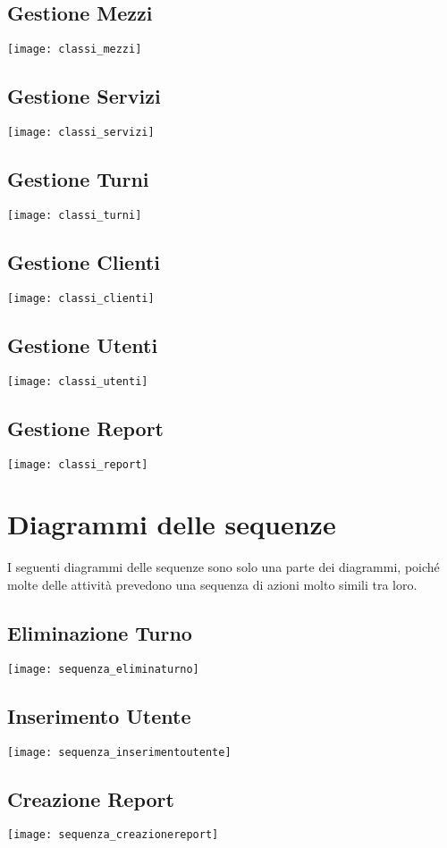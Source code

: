 \documentclass[green, fancy, 11pt]{elegantbook}
\begin{document}
\subsection{Gestione Mezzi}
\noindent \texttt{[image: classi\_mezzi]}
\newpage

\subsection{Gestione Servizi}
\noindent \texttt{[image: classi\_servizi]}
\subsection{Gestione Turni}
\noindent \texttt{[image: classi\_turni]}
\newpage

\subsection{Gestione Clienti}
\noindent \texttt{[image: classi\_clienti]}
\subsection{Gestione Utenti}
\noindent \texttt{[image: classi\_utenti]}
\newpage

\subsection{Gestione Report}
\noindent \texttt{[image: classi\_report]}
\newpage

\section{Diagrammi delle sequenze}
\noindent I seguenti diagrammi delle sequenze sono solo una parte dei diagrammi, poiché molte delle attività prevedono una sequenza di azioni molto simili tra loro.
\subsection{Eliminazione Turno}
\noindent \texttt{[image: sequenza\_eliminaturno]}
\newpage
\subsection{Inserimento Utente}
\noindent \texttt{[image: sequenza\_inserimentoutente]}
\subsection{Creazione Report}
\noindent \texttt{[image: sequenza\_creazionereport]}
\newpage
\end{document}

